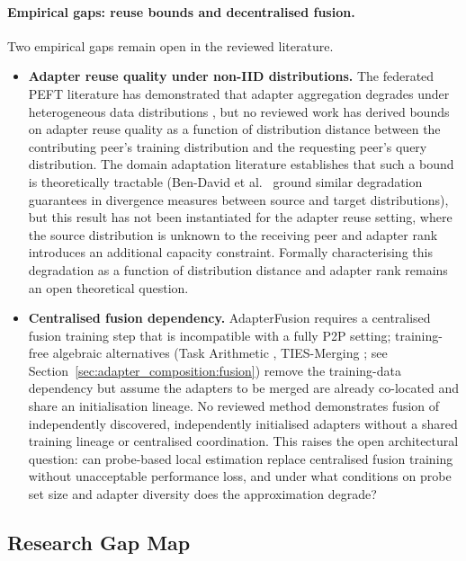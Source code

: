 \paragraph{Empirical gaps: reuse bounds and decentralised fusion.}
Two empirical gaps remain open in the reviewed literature.
\begin{itemize}
  \item \textbf{Adapter reuse quality under non-IID distributions.} The federated PEFT literature has demonstrated that adapter aggregation degrades under heterogeneous data distributions \cite{ZhangFedPETuning2023, Li2020FedProx}, but no reviewed work has derived bounds on adapter reuse quality as a function of distribution distance between the contributing peer's training distribution and the requesting peer's query distribution. The domain adaptation literature establishes that such a bound is theoretically tractable (Ben-David et al.~\cite{BenDavid2010} ground similar degradation guarantees in divergence measures between source and target distributions), but this result has not been instantiated for the adapter reuse setting, where the source distribution is unknown to the receiving peer and adapter rank introduces an additional capacity constraint. Formally characterising this degradation as a function of distribution distance and adapter rank remains an open theoretical question.
  
  \item \textbf{Centralised fusion dependency.} AdapterFusion \cite{Pfeiffer2021fusion}
    requires a centralised fusion training step that is incompatible with a fully
    P2P setting; training-free algebraic alternatives (Task Arithmetic
    \cite{Ilharco2023TaskArithmetic}, TIES-Merging \cite{Yadav2023TIES}; see
    Section~\ref{sec:adapter_composition:fusion}) remove the training-data dependency
    but assume the adapters to be merged are already co-located and share an
    initialisation lineage. No reviewed method demonstrates fusion of
    independently discovered, independently initialised adapters without a
    shared training lineage or centralised coordination. This raises the open
    architectural question: can probe-based local estimation replace centralised
    fusion training without unacceptable performance loss, and under what
    conditions on probe set size and adapter diversity does the approximation
    degrade?
\end{itemize}

\subsection{Research Gap Map}
\label{sec:synthesis_gap:gap_map}

